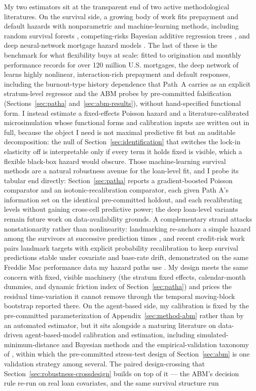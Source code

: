 \documentclass[12pt]{article}
\begin{document}
My two estimators sit at the transparent end of two active methodological literatures. On the survival side, a growing body of work fits prepayment and default hazards with nonparametric and machine-learning methods, including random survival forests \citep{ishwaran2008}, competing-risks Bayesian additive regression trees \citep{sparapani2020}, and deep neural-network mortgage hazard models \citep{sadhwani2021}. The last of these is the benchmark for what flexibility buys at scale: fitted to origination and monthly performance records for over 120 million U.S. mortgages, the deep network of \citet{sadhwani2021} learns highly nonlinear, interaction-rich prepayment and default responses, including the burnout-type history dependence that Path~A carries as an explicit stratum-level regressor and the ABM probes by pre-committed falsification (Sections~\ref{sec:patha} and~\ref{sec:abm-results}), without hand-specified functional form. I instead estimate a fixed-effects Poisson hazard and a literature-calibrated microsimulation whose functional forms and calibration inputs are written out in full, because the object I need is not maximal predictive fit but an auditable decomposition: the null of Section~\ref{sec:identification} that switches the lock-in elasticity off is interpretable only if every term it holds fixed is visible, which a flexible black-box hazard would obscure. Those machine-learning survival methods are a natural robustness avenue for the loan-level fit, and I probe its tabular end directly: Section~\ref{sec:patha} reports a gradient-boosted Poisson comparator and an isotonic-recalibration comparator, each given Path A's information set on the identical pre-committed holdout, and each recalibrating levels without gaining cross-cell predictive power; the deep loan-level variants remain future work on data-availability grounds. A complementary strand attacks nonstationarity rather than nonlinearity: landmarking re-anchors a simple hazard among the survivors at successive prediction times \citep{vanhouwelingen2007,putter2022}, and recent credit-risk work pairs landmark targets with explicit probability recalibration to keep survival predictions stable under covariate and base-rate drift, demonstrated on the same Freddie Mac performance data my hazard paths use \citep{peng2026}. My design meets the same concern with fixed, visible machinery (the stratum fixed effects, calendar-month dummies, and dynamic friction index of Section~\ref{sec:patha}) and prices the residual time-variation it cannot remove through the temporal moving-block bootstrap reported there. On the agent-based side, my calibration is fixed by the pre-committed parameterization of Appendix~\ref{sec:method-abm} rather than by an automated estimator, but it sits alongside a maturing literature on data-driven agent-based-model calibration and estimation, including simulated-minimum-distance and Bayesian methods \citep{grazzini2017,platt2020} and the empirical-validation taxonomy of \citet{fagiolo2007}, within which the pre-committed stress-test design of Section~\ref{sec:abm} is one validation strategy among several. The paired design-crossing that Section~\ref{sec:robustness-crossdesign} builds on top of it --- the ABM's decision rule re-run on real loan covariates, and the same survival structure run 
\end{document}
